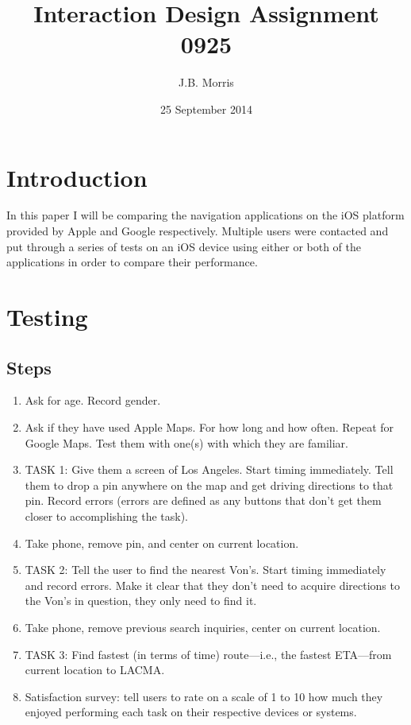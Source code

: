 \documentclass[12pt, oneside]{article}
\title{Interaction Design Assignment 0925}
\author{J.B. Morris}
\date{25 September 2014}
\begin{document}
\maketitle
\section{Introduction}
In this paper I will be comparing the navigation applications on the iOS platform provided by Apple and Google respectively. Multiple users were contacted and put through a series of tests on an iOS device using either or both of the applications in order to compare their performance. 

\section{Testing}
\subsection{Steps}

\begin{enumerate}
\item Ask for age. Record gender.
\item Ask if they have used Apple Maps. For how long and how often. Repeat for Google Maps. Test them with one(s) with which they are familiar.
\item TASK 1: Give them a screen of Los Angeles. Start timing immediately. Tell them to drop a pin anywhere on the map and get driving directions to that pin. Record errors (errors are defined as any buttons that don't get them closer to accomplishing the task).
\item Take phone, remove pin, and center on current location.
\item TASK 2: Tell the user to find the nearest Von's. Start timing immediately and record errors. Make it clear that they don't need to acquire directions to the Von's in question, they only need to find it.
\item Take phone, remove previous search inquiries, center on current location.
\item TASK 3: Find fastest (in terms of time) route—i.e., the fastest ETA—from current location to LACMA.
\item Satisfaction survey: tell users to rate on a scale of 1 to 10 how much they enjoyed performing each task on their respective devices or systems.
\end{enumerate}
\end{document}
